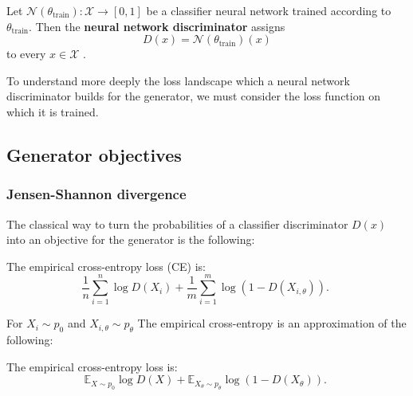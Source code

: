 \begin{definition}
    Let $\mathcal{N}(\theta_{\textrm{train}}): \mathcal{X} \rightarrow [0, 1]$ be a classifier neural network trained according to $\theta_{\textrm{train}}$.
    Then the \textbf{neural network discriminator} assigns
    \begin{equation}
        D(x) = \mathcal{N}(\theta_{\textrm{train}})(x)
    \end{equation}
    to every $x \in \mathcal{X}$ . %
\end{definition}

To understand more deeply the loss landscape which a neural network discriminator builds for the generator, we must consider the loss function on which it is trained.

\subsection{Generator objectives}
\label{sec:losses}

\subsubsection{Jensen-Shannon divergence}
\label{sec:ce_loss}

The classical way to turn the probabilities of a classifier discriminator $D(x)$ into an objective for the generator is the following:

\begin{definition}[Cross-entropy loss] %
    The empirical cross-entropy loss (CE) is:
    $$
    \frac{1}{n} \sum_{i=1}^n \log D (X_i)+\frac{1}{m} \sum_{i=1}^m \log (1-D(X_{i, \theta})) \text {. }
    $$    
\end{definition}

For $X_i\sim p_{0}$ and $X_{i, \theta}\sim p_\theta$ The empirical cross-entropy is an approximation of the following:

\begin{definition}
    The empirical cross-entropy loss is:
    $$
    \mathbb E_{X\sim p_0} \log D(X)+\mathbb E_{X_\theta\sim p_\theta} \log (1-D(X_\theta)) \text {. }
    $$    
\end{definition}

